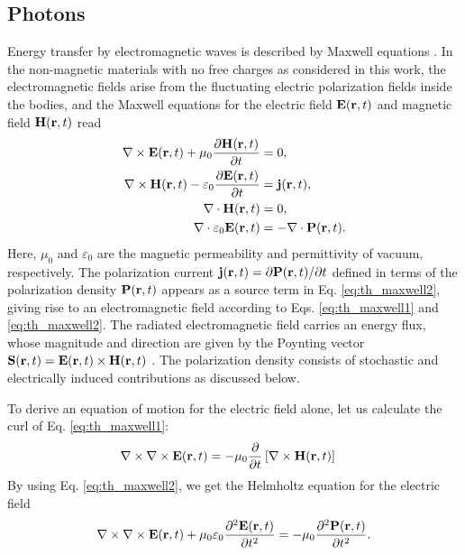 \subsection{Photons}
\label{sec:th_eom2_photon}
Energy transfer by electromagnetic waves is described by Maxwell equations \cite{jackson}. In the non-magnetic materials with no free charges as considered in this work, the electromagnetic fields arise from the fluctuating electric polarization fields inside the bodies, and the Maxwell equations for the electric field $\mathbf{E}(\mathbf{r},t)$ and magnetic field $\mathbf{H}(\mathbf{r},t)$ read \cite{novotny}
\begin{subequations}
\begin{align}
  \nabla \times \mathbf{E}(\mathbf{r},t) + \mu_0 \frac{\partial \mathbf{H}(\mathbf{r},t)}{\partial t} &= 0 , \label{eq:th_maxwell1} \\
  \nabla \times \mathbf{H}(\mathbf{r},t) - \varepsilon_0 \frac{\partial \mathbf{E}(\mathbf{r},t)}{\partial t} &=  \mathbf{j}(\mathbf{r},t) , \label{eq:th_maxwell2} \\
   \nabla \cdot \mathbf{H}(\mathbf{r},t) &= 0, \\
   \nabla \cdot \varepsilon_0 \mathbf{E}(\mathbf{r},t) &= -\nabla \cdot \mathbf{P}(\mathbf{r},t).
\end{align}
\end{subequations}
Here, $\mu_0$ and $\varepsilon_0$ are the magnetic permeability and permittivity of vacuum, respectively. The polarization current $\mathbf{j}(\mathbf{r},t)=\partial \mathbf{P}(\mathbf{r},t)/\partial t$ defined in terms of the polarization density $\mathbf{P}(\mathbf{r},t)$ appears as a source term in Eq. \eqref{eq:th_maxwell2}, giving rise to an electromagnetic field according to Eqs. \eqref{eq:th_maxwell1} and \eqref{eq:th_maxwell2}. The radiated electromagnetic field carries an energy flux, whose magnitude and direction are given by the Poynting vector $\mathbf{S}(\mathbf{r},t)=\mathbf{E}(\mathbf{r},t)\times \mathbf{H}(\mathbf{r},t)$ \cite{novotny}. The polarization density consists of stochastic and electrically induced contributions \cite{benabdallah11} as discussed below. 


To derive an equation of motion for the electric field alone, let us calculate the curl of Eq. \eqref{eq:th_maxwell1}:
\begin{alignat}{2}
  \nabla \times \nabla \times \mathbf{E}(\mathbf{r},t) &= - \mu_0 \frac{\partial}{\partial t} \left[\nabla \times \mathbf{H}(\mathbf{r},t) \right] 
\end{alignat}
By using Eq. \eqref{eq:th_maxwell2}, we get the Helmholtz equation for the electric field \cite{novotny}
\begin{equation}
   \nabla \times \nabla \times \bE(\br,t) + \mu_0 \varepsilon_0 \frac{\partial ^2\bb{E}(\br,t)}{\partial t^2}=  - \mu_0 \frac{\partial^2 \bb{P}(\br,t)}{\partial t^2}. \label{eq:th_eom_photons} %
\end{equation}


